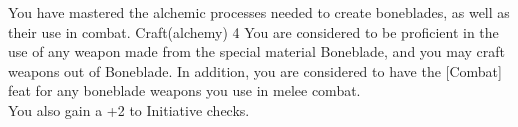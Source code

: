 \shortdescfeat
{You have mastered the alchemic processes needed to create boneblades, as well as their use in combat.}
{Craft(alchemy) 4}
{You are considered to be proficient in the use of any weapon made from the special material Boneblade, and you may craft weapons out of Boneblade. In addition, you are considered to have the  [Combat] feat for any boneblade weapons you use in melee combat.\\
You also gain a +2 to Initiative checks.}

